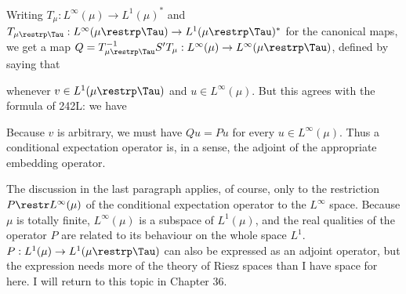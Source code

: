 {
     
\noindent Writing $T_{\mu}:L^{\infty}(\mu)\to L^1(\mu)^*$ and
$T_{\mu\restrp\Tau}:L^{\infty}(\mu\restrp\Tau)\to L^1(\mu\restrp\Tau)^*$
for the canonical maps, we get a map
$Q=T_{\mu\restrp\Tau}^{-1}S'T_{\mu}:
L^{\infty}(\mu)\to L^{\infty}(\mu\restrp\Tau)$, defined by saying that
     
     
\noindent whenever $v\in L^1(\mu\restrp\Tau)$ and 
$u\in L^{\infty}(\mu)$.   But this agrees with the formula of 242L:  we have
     
     
\noindent Because $v$ is arbitrary, we must have $Qu=Pu$ for every
$u\in L^{\infty}(\mu)$.   Thus a conditional expectation operator is, 
in a sense, the adjoint of the appropriate embedding operator.
     
The discussion in the last paragraph applies, of course, only to the
restriction $P\restr L^{\infty}(\mu)$ of the conditional expectation
operator to the $L^{\infty}$ space.   Because $\mu$ is totally finite,
$L^{\infty}(\mu)$ is a subspace of $L^1(\mu)$, and the real qualities of
the operator $P$ are related to its behaviour on the whole space $L^1$.
$P:L^1(\mu)\to L^1(\mu\restrp\Tau)$ can also be expressed as an adjoint
operator, but the expression needs more of the theory of Riesz spaces
than I have space for here.   I will return to this topic in Chapter 36.
}%
     
\discrpage
 


